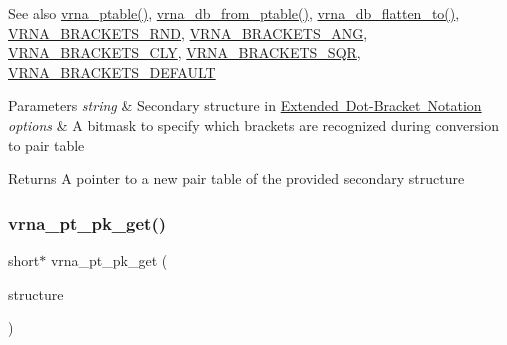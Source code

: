 \begin{DoxySeeAlso}{See also}
\mbox{\hyperlink{group__struct__utils_gae829fb8bb7f694c12a9c0bbc34c77c60}{vrna\+\_\+ptable()}}, \mbox{\hyperlink{group__struct__utils_gaf9ecd0d7877fecdbb0292e24f40283d5}{vrna\+\_\+db\+\_\+from\+\_\+ptable()}}, \mbox{\hyperlink{group__struct__utils_ga690425199c8b71545e7196e3af1436f8}{vrna\+\_\+db\+\_\+flatten\+\_\+to()}}, \mbox{\hyperlink{group__struct__utils_gac92d5fa7c6625bce2670ece510a24fbd}{V\+R\+N\+A\+\_\+\+B\+R\+A\+C\+K\+E\+T\+S\+\_\+\+R\+ND}}, \mbox{\hyperlink{group__struct__utils_ga863e03f7f73f10fc9bbcbefbdda4bec8}{V\+R\+N\+A\+\_\+\+B\+R\+A\+C\+K\+E\+T\+S\+\_\+\+A\+NG}}, \mbox{\hyperlink{group__struct__utils_gaf41be40e79cb756c4e0bb8edb4d803d2}{V\+R\+N\+A\+\_\+\+B\+R\+A\+C\+K\+E\+T\+S\+\_\+\+C\+LY}}, \mbox{\hyperlink{group__struct__utils_ga60525d61d7496eeea490a37f3d6bf757}{V\+R\+N\+A\+\_\+\+B\+R\+A\+C\+K\+E\+T\+S\+\_\+\+S\+QR}}, \mbox{\hyperlink{group__struct__utils_ga559ebf76b1b289f85309f4206e99aa1a}{V\+R\+N\+A\+\_\+\+B\+R\+A\+C\+K\+E\+T\+S\+\_\+\+D\+E\+F\+A\+U\+LT}}
\end{DoxySeeAlso}

\begin{DoxyParams}{Parameters}
{\em string} & Secondary structure in \mbox{\hyperlink{rna_structure_notations_dot-bracket-ext-notation}{Extended Dot-\/\+Bracket Notation}} \\
\hline
{\em options} & A bitmask to specify which brackets are recognized during conversion to pair table \\
\hline
\end{DoxyParams}
\begin{DoxyReturn}{Returns}
A pointer to a new pair table of the provided secondary structure 
\end{DoxyReturn}
\mbox{\label{group__struct__utils_gacca520048b24ec5a8978f4dafb4e4bf8}} 
\subsubsection{\texorpdfstring{vrna\+\_\+pt\+\_\+pk\+\_\+get()}{vrna\_pt\_pk\_get()}}
{\footnotesize\ttfamily short$\ast$ vrna\+\_\+pt\+\_\+pk\+\_\+get (\begin{DoxyParamCaption}\item[{const char $\ast$}]{structure }\end{DoxyParamCaption})}




